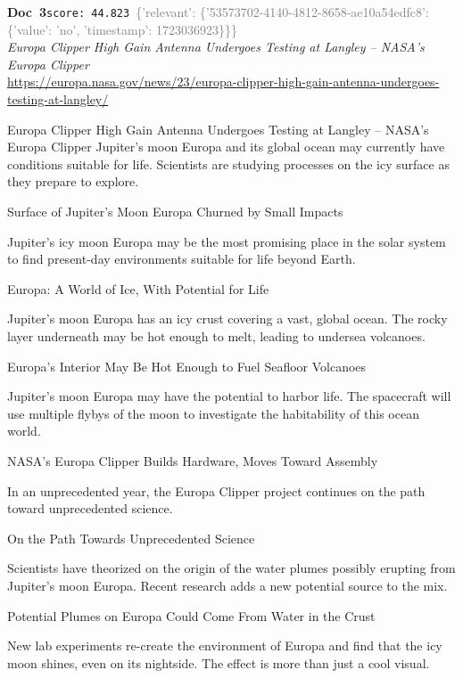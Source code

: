 \documentclass[a4paper,11pt]{article}
\begin{document}
\begin{docenv}
{\footnotesize\textcolor{doccolor}{\textbf{Doc~3}}}\hfill{\tiny\texttt{score:~44.823}}\ {\tiny\textcolor{gray}{\{'relevant': \{'53573702-4140-4812-8658-ae10a54edfc8': \{'value': 'no', 'timestamp': 1723036923\}\}\}}}\\[3pt]
{\small\textit{Europa Clipper High Gain Antenna Undergoes Testing at Langley – NASA's Europa Clipper}}\\[2pt]
{\tiny\url{https://europa.nasa.gov/news/23/europa-clipper-high-gain-antenna-undergoes-testing-at-langley/}}\\[4pt]
{\footnotesize Europa Clipper High Gain Antenna Undergoes Testing at Langley – NASA's Europa Clipper
Jupiter’s moon Europa and its global ocean may currently have conditions suitable for life. Scientists are studying processes on the icy surface as they prepare to explore.

Surface of Jupiter's Moon Europa Churned by Small Impacts

Jupiter’s icy moon Europa may be the most promising place in the solar system to find present-day environments suitable for life beyond Earth. 

Europa: A World of Ice, With Potential for Life

Jupiter’s moon Europa has an icy crust covering a vast, global ocean. The rocky layer underneath may be hot enough to melt, leading to undersea volcanoes.

Europa's Interior May Be Hot Enough to Fuel Seafloor Volcanoes

Jupiter’s moon Europa may have the potential to harbor life. The spacecraft will use multiple flybys of the moon to investigate the habitability of this ocean world.

NASA's Europa Clipper Builds Hardware, Moves Toward Assembly

In an unprecedented year, the Europa Clipper project continues on the path toward unprecedented science. 

On the Path Towards Unprecedented Science

Scientists have theorized on the origin of the water plumes possibly erupting from Jupiter's moon Europa. Recent research adds a new potential source to the mix.

Potential Plumes on Europa Could Come From Water in the Crust

New lab experiments re-create the environment of Europa and find that the icy moon shines, even on its nightside. The effect is more than just a cool visual.

}
\end{docenv}
\end{document}
